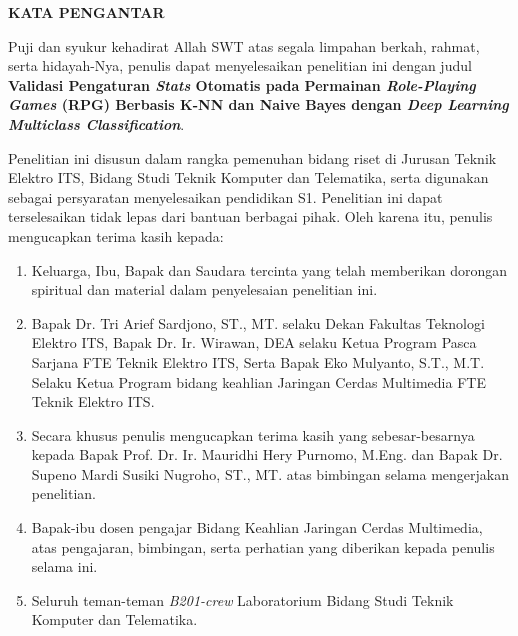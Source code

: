 \begin{center}
\Large\textbf{KATA PENGANTAR}
\end{center}
\vspace{2ex}

\setlength{\parindent}{1cm} Puji dan syukur kehadirat Allah SWT atas segala limpahan berkah, rahmat, serta hidayah-Nya, penulis  dapat menyelesaikan penelitian ini dengan judul \textbf{Validasi Pengaturan \textit{Stats} Otomatis pada Permainan \textit{Role-Playing Games} (RPG) Berbasis K-NN dan Naive Bayes dengan \textit{Deep Learning Multiclass Classification}}.
\vspace{1ex}

Penelitian ini disusun dalam rangka pemenuhan bidang riset di Jurusan Teknik Elektro ITS, Bidang  Studi Teknik Komputer dan Telematika, serta digunakan sebagai persyaratan menyelesaikan pendidikan  S1. Penelitian ini dapat terselesaikan tidak lepas dari bantuan berbagai pihak. Oleh karena itu, penulis mengucapkan terima kasih kepada:
\vspace{1ex}

\begin{enumerate}[nolistsep]
	\item Keluarga, Ibu, Bapak dan Saudara tercinta yang telah memberikan dorongan spiritual dan material dalam penyelesaian penelitian ini.
	\vspace{1ex}
	\item Bapak Dr. Tri Arief Sardjono, ST., MT. selaku Dekan Fakultas Teknologi Elektro ITS, Bapak Dr. Ir. Wirawan, DEA selaku Ketua Program Pasca Sarjana FTE Teknik Elektro ITS, Serta Bapak Eko Mulyanto, S.T., M.T. Selaku Ketua Program bidang keahlian Jaringan Cerdas Multimedia FTE Teknik Elektro ITS.
	\vspace{1ex}
	\item Secara khusus penulis mengucapkan terima kasih yang sebesar-besarnya kepada Bapak Prof. Dr. Ir. Mauridhi Hery Purnomo, M.Eng. dan Bapak Dr. Supeno Mardi Susiki Nugroho, ST., MT. atas bimbingan selama mengerjakan  penelitian.
	\vspace{1ex}
	\item Bapak-ibu dosen pengajar Bidang Keahlian Jaringan Cerdas Multimedia, atas pengajaran,  bimbingan, serta perhatian yang diberikan kepada penulis selama ini.
	\vspace{1ex}
	\item Seluruh teman-teman \textit{B201-crew} Laboratorium Bidang Studi Teknik Komputer dan Telematika.
\end{enumerate}
\vspace{1ex}

